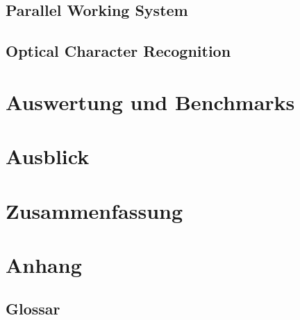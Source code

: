 \documentclass[12pt]{article}
\begin{document}
\newpage

\subsection{Parallel Working System}
\label{subsec:parallelws}


\newpage

\subsection{Optical Character Recognition}
\label{subsec:ocr}


\newpage %

\section{Auswertung und Benchmarks}
\label{sec:auswertung}


\newpage %

\section{Ausblick}
\label{sec:ausblick}


\newpage %

\section{Zusammenfassung}
\label{sec:zusammenfassung}


\newpage %

\cfoot{}
\section{Anhang}
\label{sec:anhang}

\subsection{Glossar}
\label{subsec:glossar}
\begingroup
\renewcommand{\section}[2]{}
\printglossary[style=tree]
\endgroup
\newpage
\end{document}
